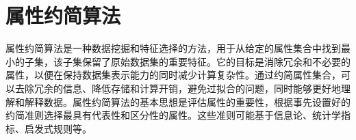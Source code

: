 







\section{属性约简算法}

属性约简算法是一种数据挖掘和特征选择的方法，用于从给定的属性集合中找到最小的子集，该子集保留了原始数据集的重要特征。它的目标是消除冗余和不必要的属性，以便在保持数据集表示能力的同时减少计算复杂性。通过约简属性集合，可以去除冗余的信息、降低存储和计算开销，避免过拟合的问题，同时能够更好地理解和解释数据。属性约简算法的基本思想是评估属性的重要性，根据事先设置好的约简准则选择最具有代表性和区分性的属性。这些准则可能基于信息论、统计学指标、启发式规则等。

